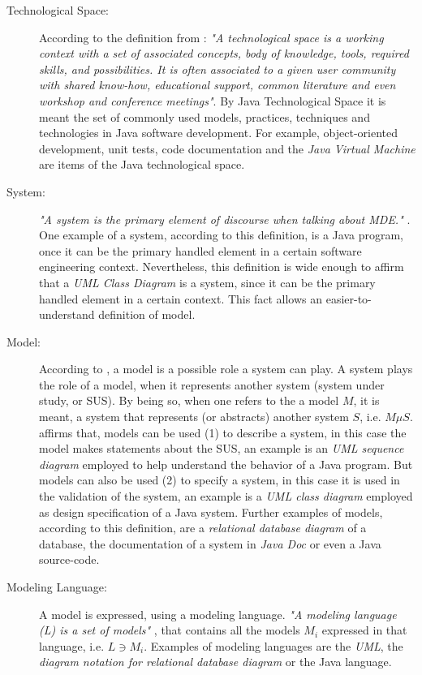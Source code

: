 \documentclass[tuberlin,cic,tc,english,noabntcite]{iiufrgs}
\begin{document}
\begin{description}
	\item[Technological Space:] According to the definition from \citet[p. 1]{kurtev2002technological}: \emph{"A technological space is a working context with a set of associated concepts, body of knowledge, tools, required skills, and possibilities. It is often associated to a given user community with shared know-how, educational support, common literature and even workshop and conference meetings"}. By Java Technological Space it is meant the set of commonly used models, practices, techniques and technologies in Java software development. For example, object-oriented development, unit tests, code documentation and the \emph{Java Virtual Machine} are items of the Java technological space.

	\item[System:] \emph{"A system is the primary element of discourse when talking about MDE."} \citep[p. 13]{favre2004foundations}. One example of a system, according to this definition, is a Java program, once it can be the primary handled element in a certain software engineering context. Nevertheless, this definition is wide enough to affirm that a \emph{UML Class Diagram} is a system, since it can be the primary handled element in a certain context. This fact allows an easier-to-understand definition of model.

	\item[Model:] According to \citet{favre2004foundations}, a model is a possible role a system can play. A system plays the role of a model, when it represents another system (system under study, or SUS). By being so, when one refers to the a model $M$, it is meant, a system that represents (or abstracts) another system $S$, i.e. $M \mu S$. \citet{seidewitz2003models} affirms that, models can be used (1) to describe a system, in this case the model makes statements about the SUS, an example is an \emph{UML sequence diagram} employed to help understand the behavior of a Java program. But models can also be used (2) to specify a system, in this case it is used in the validation of the system, an example is a \emph{UML class diagram} employed as design specification of a Java system. Further examples of models, according to this definition, are a \emph{relational database diagram} of a database, the documentation of a system in \emph{Java Doc} or even a Java source-code.

	\item[Modeling Language:] A model is expressed, using a modeling language. \emph{"A modeling language (L) is a set of models"} \citep[p. 13]{favre2004foundations}, that contains all the models $M_i$ expressed in that language, i.e. $L \owns M_i$. Examples of modeling languages are the \emph{UML}, the \emph{diagram notation for relational database diagram} or the Java language.


\end{description}
\end{document}
